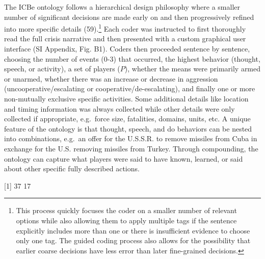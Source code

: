 \documentclass{article}
\renewcommand{\arraystretch}{0.8}
\begin{document}
The ICBe ontology follows a hierarchical design philosophy where a
smaller number of significant decisions are made early on and then
progressively refined into more specific details (59).\footnote{This
  process quickly focuses the coder on a smaller number of relevant
  options while also allowing them to apply multiple tags if the
  sentence explicitly includes more than one or there is insufficient
  evidence to choose only one tag. The guided coding process also allows
  for the possibility that earlier coarse decisions have less error than
  later fine-grained decisions.} Each coder was instructed to first
thoroughly read the full crisis narrative and then presented with a
custom graphical user interface (SI Appendix, Fig. B1). Coders then
proceeded sentence by sentence, choosing the number of events (0-3) that
occurred, the highest behavior (thought, speech, or activity), a set of
players (\(P\)), whether the means were primarily armed or unarmed,
whether there was an increase or decrease in aggression
(uncooperative/escalating or cooperative/de-escalating), and finally one
or more non-mutually exclusive specific activities. Some additional
details like location and timing information was always collected while
other details were only collected if appropriate, e.g.~force size,
fatalities, domains, units, etc. A unique feature of the ontology is
that thought, speech, and do behaviors can be nested into combinations,
e.g.~an offer for the U.S.S.R. to remove missiles from Cuba in exchange
for the U.S. removing missiles from Turkey. Through compounding, the
ontology can capture what players were said to have known, learned, or
said about other specific fully described actions.

\clearpage
\onecolumn

{[}1{]} 37 17

\providecommand{\docline}[3]{\noalign{\global\setlength{\arrayrulewidth}{#1}}\arrayrulecolor[HTML]{#2}\cline{#3}}

\setlength{\tabcolsep}{2pt}

\renewcommand*{\arraystretch}{0.75}
\end{document}
